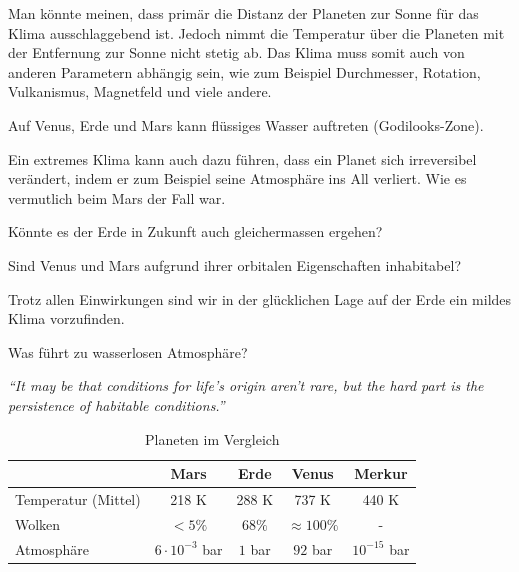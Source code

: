 \begin{refsection}
Man könnte meinen, dass primär die Distanz der Planeten zur Sonne für das  Klima ausschlaggebend ist. Jedoch nimmt die Temperatur über die Planeten mit der Entfernung zur Sonne nicht stetig ab. Das Klima muss somit auch von anderen Parametern abhängig sein, wie zum Beispiel Durchmesser, Rotation, Vulkanismus, Magnetfeld und viele andere.

Auf Venus, Erde und Mars kann flüssiges Wasser auftreten (Godilooks-Zone).

Ein extremes Klima kann auch dazu führen, dass ein Planet sich irreversibel verändert, indem er zum Beispiel seine Atmosphäre ins All verliert. Wie es vermutlich beim Mars der Fall war.

Könnte es der Erde in Zukunft auch gleichermassen ergehen?

Sind Venus und Mars aufgrund ihrer orbitalen Eigenschaften inhabitabel?

Trotz allen Einwirkungen sind wir in der glücklichen Lage auf der Erde ein mildes Klima vorzufinden. 

Was führt zu wasserlosen Atmosphäre?

\vspace{5pt}
\textit{“It may be that conditions for life’s origin aren’t rare, but the hard part is the persistence of habitable conditions.”} \\
\vspace{5pt}

\begin{center}
\begin{table}
	\center
	\begin{tabular}{l|c c c c}
                      & Mars    & Erde   & Venus           & Merkur\\
  \hline
  Temperatur (Mittel) & 218 K   & 288 K  & 737 K           & 440 K\\
  Wolken              & $<5\%$ & $68\%$ & $\approx100\%$ & - \\
  Atmosphäre          & $6 \cdot 10^{-3}$ bar & $1$ bar & $92$ bar & $10^{-15}$ bar
	
\end{tabular}
\caption{Planeten im Vergleich}
\end{table}

\end{center}



\end{refsection}
